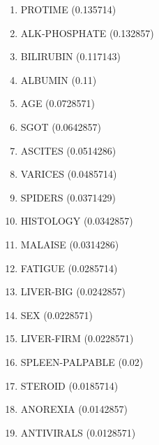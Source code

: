 \begin{enumerate}
\item PROTIME (0.135714)
\item ALK-PHOSPHATE (0.132857)
\item BILIRUBIN (0.117143)
\item ALBUMIN (0.11)
\item AGE (0.0728571)
\item SGOT (0.0642857)
\item ASCITES (0.0514286)
\item VARICES (0.0485714)
\item SPIDERS (0.0371429)
\item HISTOLOGY (0.0342857)
\item MALAISE (0.0314286)
\item FATIGUE (0.0285714)
\item LIVER-BIG (0.0242857)
\item SEX (0.0228571)
\item LIVER-FIRM (0.0228571)
\item SPLEEN-PALPABLE (0.02)
\item STEROID (0.0185714)
\item ANOREXIA (0.0142857)
\item ANTIVIRALS (0.0128571)
\end{enumerate}